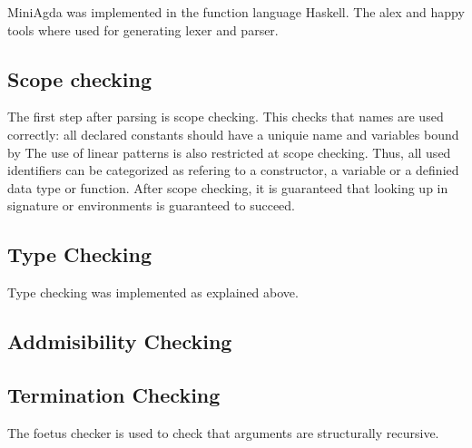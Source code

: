 MiniAgda was implemented in the function language Haskell.
The alex and happy tools where used for generating lexer and parser.

\subsection{Scope checking}
The first step after parsing is scope checking. This checks that names are used correctly:
all declared constants should have a uniquie name and variables bound by 
The use of linear patterns is also restricted at scope checking.
Thus, all used identifiers can be categorized as refering to a constructor, a variable or a definied data type or
function.
After scope checking, it is guaranteed that looking up in signature or environments is guaranteed to succeed.
\subsection{Type Checking}
Type checking was implemented as explained above.
\subsection{Addmisibility Checking}

\subsection{Termination Checking}
The foetus checker is used to check that arguments are structurally recursive.